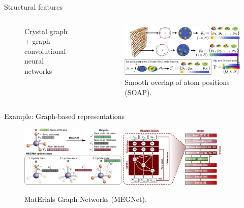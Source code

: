 \documentclass[aspectratio=169]{beamer}
\begin{document}
\begin{frame}{Structural features}
\begin{columns}
\begin{figure}
            \caption{Crystal graph + graph convolutional neural networks}
        \end{figure}
        \begin{figure}
            \centering
            \includegraphics[width=\textwidth]{lectures/slides_tex/figures/soap.png}
            \caption{Smooth overlap of atom positions (SOAP).\cite{rosenbrockDiscoveringBuildingBlocks2017}}
        \end{figure}
    \end{columns}
\end{frame}


\begin{frame}{Example: Graph-based representations}
    \begin{figure}
        \centering
        \includegraphics[width=0.45\textwidth]{lectures/slides_tex/figures/model_diagram.png}
        \includegraphics[width=0.45\textwidth]{lectures/slides_tex/figures/model_arch.jpg}
        \caption{MatErials Graph Networks (MEGNet).\cite{chenGraphNetworksUniversal2019}}
    \end{figure}
\end{frame}
\end{document}
